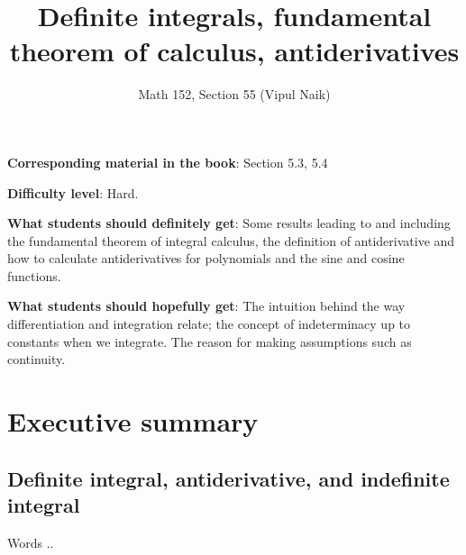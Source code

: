 \documentclass[10pt]{amsart}
\title{Definite integrals, fundamental theorem of calculus, antiderivatives}
\author{Math 152, Section 55 (Vipul Naik)}
\begin{document}
\maketitle

{\bf Corresponding material in the book}: Section 5.3, 5.4

{\bf Difficulty level}: Hard.

{\bf What students should definitely get}: Some results leading to and
including the fundamental theorem of integral calculus, the definition
of antiderivative and how to calculate antiderivatives for polynomials
and the sine and cosine functions.

{\bf What students should hopefully get}: The intuition behind the way
differentiation and integration relate; the concept of indeterminacy
up to constants when we integrate. The reason for making assumptions
such as continuity.

\section*{Executive summary}

\subsection{Definite integral, antiderivative, and indefinite integral}

Words ..
\end{document}
